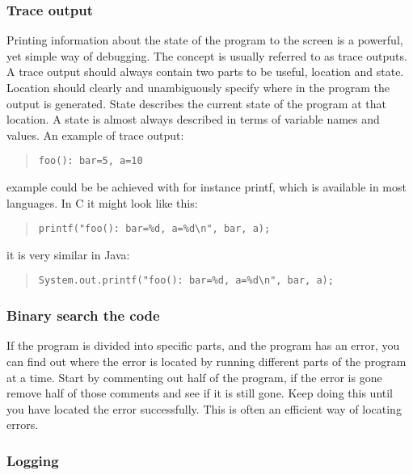 \documentclass[11pt,a4paper,twoside]{article}
\begin{document}
\subsubsection{Trace output}

Printing information about the state of the program to the screen is a
powerful, yet simple way of debugging. The concept is usually referred to as
trace outputs. A trace output should always contain two parts to be useful,
location and state. Location should clearly and unambiguously specify where in
the program the output is generated. State describes the current state of the
program at that location. A state is almost always described in terms of
variable names and values. An example of trace output:

\begin{quote}
\begin{verbatim}
foo(): bar=5, a=10
\end{verbatim}
\end{quote}

 example could be be achieved with for instance printf, which is available
in most languages. In C it might look like this:

\begin{quote}
\begin{verbatim}
printf("foo(): bar=%d, a=%d\n", bar, a);
\end{verbatim}
\end{quote}

 it is very similar in Java:

\begin{quote}
\begin{verbatim}
System.out.printf("foo(): bar=%d, a=%d\n", bar, a);
\end{verbatim}
\end{quote}


\subsubsection{Binary search the code}
If the program is divided into specific parts, and the program has an error,
 you can find out where the error is located by running different parts of the 
 program at a time. Start by commenting out half of the program, if the 
 error is gone remove half of those comments and see if it is still gone. Keep
 doing this until you have located the error successfully. This is often an efficient
 way of locating errors.

\subsubsection{Logging}
\end{document}
